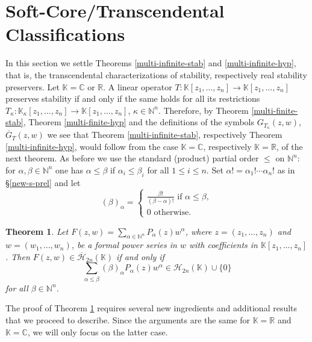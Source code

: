 \documentclass[10pt,reqno]{amsart}
\theoremstyle{plain}
\newtheorem{theorem}{Theorem}[section]
\theoremstyle{definition}
\theoremstyle{remark}
\numberwithin{equation}{section}
\newcommand{\NN}{\mathbb{N}}
\newcommand{\HH}{\mathcal{H}}
\newcommand{\HHH}{\overline{\mathcal{H}}}
\newcommand{\RR}{\mathbb{R}}
\newcommand{\CC}{\mathbb{C}}
\newcommand{\KK}{\mathbb{K}}
\begin{document}
\section{Soft-Core/Transcendental Classifications}\label{s-8}

In this section we settle Theorems \ref{multi-infinite-stab} 
and \ref{multi-infinite-hyp}, that is, the transcendental 
characterizations of stability, respectively real stability preservers. 
Let $\KK=\CC$ or $\RR$. A linear operator $T:\KK[z_1,\ldots,z_n]\to 
\KK[z_1,\ldots,z_n]$ preserves stability if and only if the same holds for 
all its restrictions $T_\kappa:\KK_\kappa[z_1,\ldots,z_n]\to 
\KK[z_1,\ldots,z_n]$, 
$\kappa\in\NN^n$. Therefore, by Theorem \ref{multi-finite-stab}, 
Theorem \ref{multi-finite-hyp} and the definitions of the symbols
$G_{T_\kappa}(z,w)$, $\overline{G}_T(z,w)$ we see that 
Theorem \ref{multi-infinite-stab}, respectively 
Theorem \ref{multi-infinite-hyp}, would follow from the case $\KK=\CC$, 
respectively $\KK=\RR$, of the next theorem. 
As before we use the standard (product) partial order $\le$ on $\NN^n$: for  
$\alpha, \beta \in \NN^n$ one has $\alpha \leq \beta$ if 
$\alpha_i \leq \beta_i$ for all $1 \leq i \leq n$. Set 
$\alpha! = \alpha_1! \cdots \alpha_n!$ as in \S \ref{new-s-prel} and let 
$$
(\beta)_\alpha = \begin{cases} 
\frac {\beta!}{(\beta-\alpha)! } \mbox{ if } \alpha \leq \beta, \\ 
0 \mbox{ otherwise.} 
\end{cases}
$$

\begin{theorem}\label{t-trans}
Let $F(z,w)= \sum_{\alpha \in \NN^n}P_\alpha(z)w^\alpha$, where
$z=(z_1,\ldots,z_n)$ and $w=(w_1,\ldots,w_n)$, be a formal power 
series in 
$w$ with coefficients in $\KK[z_1,\ldots, z_n]$. Then 
$F(z,w) \in \HHH_{2n}(\KK)$ if and only if 
$$\sum_{\alpha \leq \beta} (\beta)_\alpha P_\alpha(z)w^\alpha 
\in \HH_{2n}(\KK) \cup\{0\}$$ 
for all $\beta \in \NN^n$. 
\end{theorem}

The proof of Theorem \ref{t-trans} requires several new ingredients and
additional results that we proceed to describe. Since the arguments are the 
same for $\KK=\RR$ and $\KK=\CC$, we will only focus on the latter case.
\end{document}
